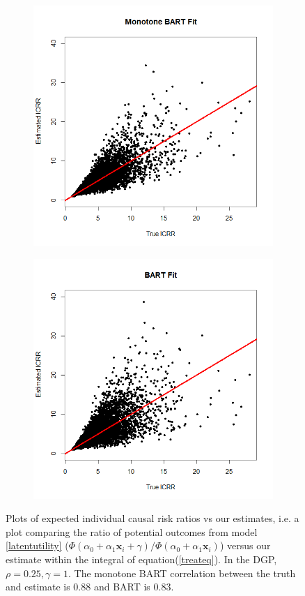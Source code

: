 \documentclass[aoas,preprint, 11pt, dvipsnames, table, x11name]{imsart}
\renewcommand{\bm}[1]{\mathbf{#1}}
\theoremstyle{remark}
\begin{document}
\begin{figure}[h]
	\centering
	\begin{subfigure}{.5\textwidth}
		\includegraphics[width=7.cm]{monobart_ICRR_png.png}
	\end{subfigure}%
	\begin{subfigure}{.5\textwidth}
		\includegraphics[width=7.cm]{Bart_ICRR_png.png}
	\end{subfigure}
	\caption[Comparing Bart with and without monotinicity constraint]{Plots of expected individual causal risk ratios vs our estimates, i.e. a plot comparing the ratio of potential outcomes from model \ref{latentutility} ($\Phi(\alpha_0+\alpha_1\bm{x}_i+\gamma)/\Phi(\alpha_0+\alpha_1\bm{x}_i)$) versus our estimate within the integral of equation(\ref{treateq}).  In the DGP, $\rho=0.25,\gamma=1$.  The monotone BART correlation between the truth and estimate is 0.88 and BART is 0.83.}
	\label{monovsnorm}
\end{figure}
\end{document}
